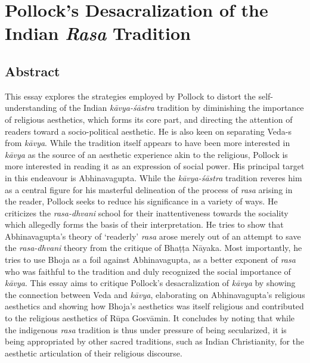 \chapter[Pollock’s Desacralization of the Indian \textsl{Rasa} Tradition]{Pollock’s Desacralization of the Indian \textsl{Rasa} Tradition}\label{chapter\thechapter:begin}

\section*{Abstract}

This essay explores the strategies employed by Pollock to distort the self-understanding of the Indian \textsl{kāvya-śāstra} tradition by diminishing the importance of religious aesthetics, which forms its core part, and directing the attention of readers toward a socio-political aesthetic. He is also keen on separating Veda-s from \textsl{kāvya}. While the tradition itself appears to have been more interested in \textsl{kāvya} as the source of an aesthetic experience akin to the religious, Pollock is more interested in reading it as an expression of social power. His principal target in this endeavour is Abhinavagupta. While the \textsl{kāvya-śāstra} tradition reveres him as a central figure for his masterful delineation of the process of \textsl{rasa} arising in the reader, Pollock seeks to reduce his significance in a variety of ways. He criticizes the \textsl{rasa-dhvani} school for their inattentiveness towards the sociality which allegedly forms the basis of their interpretation. He tries to show that Abhinavagupta's theory of `readerly' \textsl{rasa} arose merely out of an attempt to save the \textsl{rasa-dhvani} theory from the critique of Bhaṭṭa Nāyaka. Most importantly, he tries to use Bhoja as a foil against Abhinavagupta, as a better exponent of \textsl{rasa} who was faithful to the tradition and duly recognized the social importance of \textsl{kāvya}. This essay aims to critique Pollock's desacralization of \textsl{kāvya} by showing the connection between Veda and \textsl{kāvya}, elaborating on Abhinavagupta's religious aesthetics and showing how Bhoja's aesthetics was itself religious and contributed to the religious aesthetics of Rūpa Gosvāmin. It concludes by noting that while the indigenous \textsl{rasa} tradition is thus under pressure of being secularized, it is being appropriated by other sacred traditions, such as Indian Christianity, for the aesthetic articulation of their religious discourse.

